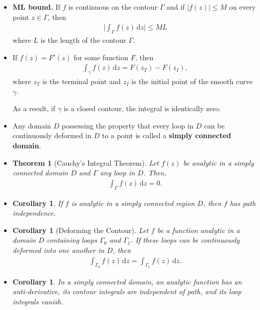 \documentclass[10pt]{article}
\newtheorem{theorem}[lemma]{Theorem}
\newtheorem{corollary}[lemma]{Corollary}
\newcommand{\dee}{\mathrm{d}}
\begin{document}
\begin{itemize}
    \item {\bf ML bound.} If $f$ is continuous on the contour $\Gamma$ and if $|f(z)| \leq M$ on every point $z \in \Gamma$, then
    \begin{align*}
      \bigg| \int_\Gamma f(z)\, \dee z \bigg| \leq ML
    \end{align*}
    where $L$ is the length of the contour $\Gamma$.

    \item If $f(z) = F'(z)$ for some function $F$, then
    \begin{align*}
      \int_\gamma f(z)\, \dee z = F(z_T) - F(z_I),
    \end{align*}
    where $z_T$ is the terminal point and $z_I$ is the initial point of the smooth curve $\gamma$.

    As a result, if $\gamma$ is a closed contour, the integral is identically zero.    

    \item Any domain $D$ possessing the property that every loop in $D$ can be continuously deformed in $D$ to a point is called a {\bf simply connected domain}.


    \item \begin{theorem}[Cauchy's Integral Theorem]
      Let $f(z)$ be analytic in a simply connected domain $D$ and $\Gamma$ any loop in $D$. Then,
      \begin{align*}
        \int_{\Gamma} f(z)\, \dee z = 0.
      \end{align*}
    \end{theorem}

    \item \begin{corollary}
      If $f$ is analytic in a simply connected region $D$, then $f$ has path independence.
    \end{corollary}

    \item \begin{corollary}[Deforming the Contour]
      Let $f$ be a function analytic in a domain $D$ containing loops $\Gamma_0$ and $\Gamma_1$. If these loops can be continuously deformed into one another in $D$, then
      \begin{align*}
        \int_{\Gamma_0} f(z)\, \dee z = \int_{\Gamma_1} f(z)\, \dee z.
      \end{align*}
    \end{corollary}

    \item \begin{corollary}
      In a simply connected domain, an analytic function has an anti-derivative, its contour integrals are independent of path, and its loop integrals vanish.
    \end{corollary}


\end{itemize}
\end{document}
